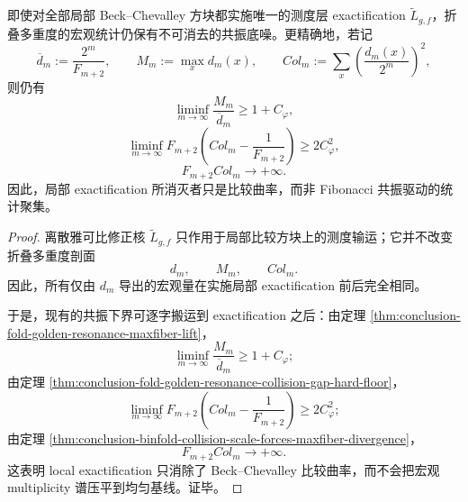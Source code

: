\begin{theorem}\label{thm:conclusion-local-exactification-macroscopic-resonance-separation}
即使对全部局部 Beck--Chevalley 方块都实施唯一的测度层 exactification \(\widetilde L_{g,f}\)，折叠多重度的宏观统计仍保有不可消去的共振底噪。更精确地，若记
\[
\overline d_m:=\frac{2^m}{F_{m+2}},
\qquad
M_m:=\max_x d_m(x),
\qquad
Col_m:=\sum_x\left(\frac{d_m(x)}{2^m}\right)^2,
\]
则仍有
\[
\liminf_{m\to\infty}\frac{M_m}{\overline d_m}\ge 1+C_\varphi,
\]
\[
\liminf_{m\to\infty}F_{m+2}\!\left(Col_m-\frac1{F_{m+2}}\right)\ge 2C_\varphi^2,
\]
\[
F_{m+2}Col_m\longrightarrow+\infty.
\]
因此，局部 exactification 所消灭者只是比较曲率，而非 Fibonacci 共振驱动的统计聚集。
\end{theorem}
\begin{proof}
离散雅可比修正核 \(\widetilde L_{g,f}\) 只作用于局部比较方块上的测度输运；它并不改变折叠多重度剖面
\[
d_m,\qquad M_m,\qquad Col_m.
\]
因此，所有仅由 \(d_m\) 导出的宏观量在实施局部 exactification 前后完全相同。

于是，现有的共振下界可逐字搬运到 exactification 之后：由定理 \ref{thm:conclusion-fold-golden-resonance-maxfiber-lift}，
\[
\liminf_{m\to\infty}\frac{M_m}{\overline d_m}\ge 1+C_\varphi;
\]
由定理 \ref{thm:conclusion-fold-golden-resonance-collision-gap-hard-floor}，
\[
\liminf_{m\to\infty}F_{m+2}\!\left(Col_m-\frac1{F_{m+2}}\right)\ge 2C_\varphi^2;
\]
由定理 \ref{thm:conclusion-binfold-collision-scale-forces-maxfiber-divergence}，
\[
F_{m+2}Col_m\to+\infty.
\]
这表明 local exactification 只消除了 Beck--Chevalley 比较曲率，而不会把宏观 multiplicity 谱压平到均匀基线。证毕。
\end{proof}

